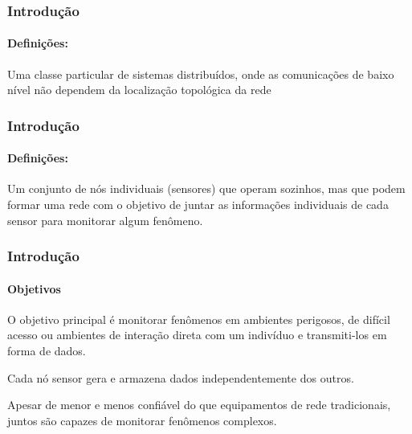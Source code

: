 \documentclass[notes]{beamer}
\begin{document}
\begin{frame}
\frametitle{Introdução}
\framesubtitle{Definições:} 

\begin{block}

Uma classe particular de sistemas distribuídos, onde as comunicações de baixo
nível não dependem da localização topológica da rede \cite{Huang_2}

\end{block}

\end{frame}

\begin{frame}
\frametitle{Introdução}
\framesubtitle{Definições:} 
\begin{block}

Um conjunto de nós individuais (sensores) que operam sozinhos, mas que podem formar uma rede com o objetivo de juntar as informações individuais de cada sensor para monitorar algum fenômeno.

\end{block}

\end{frame}

\begin{frame}
\frametitle{Introdução}
\framesubtitle{Objetivos}

\begin{block}

O objetivo principal é monitorar fenômenos em ambientes perigosos, de difícil acesso ou ambientes de interação direta com um indivíduo e transmiti-los em forma de dados. 
\end{block}

\begin{block}

Cada nó sensor gera e armazena dados independentemente dos outros.

\end{block}

\begin{block}

Apesar de menor e menos confiável do que equipamentos de rede tradicionais, juntos são capazes de monitorar fenômenos complexos. 

\end{block}

\end{frame}
\end{document}
